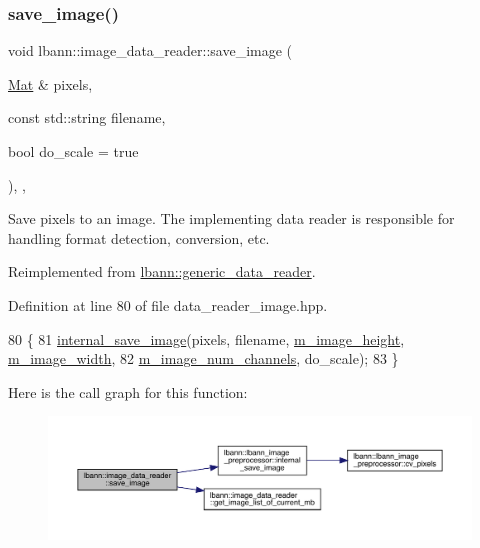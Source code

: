 \subsubsection{\texorpdfstring{save\+\_\+image()}{save\_image()}}
{\footnotesize\ttfamily void lbann\+::image\+\_\+data\+\_\+reader\+::save\+\_\+image (\begin{DoxyParamCaption}\item[{\hyperlink{base_8hpp_a68f11fdc31b62516cb310831bbe54d73}{Mat} \&}]{pixels,  }\item[{const std\+::string}]{filename,  }\item[{bool}]{do\+\_\+scale = {\ttfamily true} }\end{DoxyParamCaption})\hspace{0.3cm}{\ttfamily [inline]}, {\ttfamily [override]}, {\ttfamily [virtual]}}

Save pixels to an image. The implementing data reader is responsible for handling format detection, conversion, etc. 

Reimplemented from \hyperlink{classlbann_1_1generic__data__reader_a8cf298061c73f55e2fe717acd2a9f178}{lbann\+::generic\+\_\+data\+\_\+reader}.



Definition at line 80 of file data\+\_\+reader\+\_\+image.\+hpp.


\begin{DoxyCode}
80                                                                                         \{
81     \hyperlink{classlbann_1_1lbann__image__preprocessor_a3c4f4cc5c90233696566a35a62a1708c}{internal\_save\_image}(pixels, filename, \hyperlink{classlbann_1_1image__data__reader_a0632efa3deaa9d61e671f741909eb3fe}{m\_image\_height}, 
      \hyperlink{classlbann_1_1image__data__reader_af001f3d1c0f1c580b66988233b3a64f0}{m\_image\_width},
82                         \hyperlink{classlbann_1_1image__data__reader_aab1a440f361521dc7bd583cefe1061f8}{m\_image\_num\_channels}, do\_scale);
83   \}
\end{DoxyCode}
Here is the call graph for this function\+:\nopagebreak
\begin{figure}[H]
\begin{center}
\leavevmode
\includegraphics[width=350pt]{classlbann_1_1image__data__reader_a71e4fa1eb8212cce88a2ed408ceeac51_cgraph}
\end{center}
\end{figure}
\mbox{\label{classlbann_1_1image__data__reader_a8e9dbeaa0239d56597455cc23787a21d}} 
